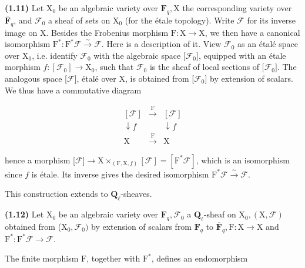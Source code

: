 \documentclass[10pt,leqno]{article}
\begin{document}
\noindent \textbf{(1.11)} Let \(\mathrm{X}_{0}\) be an algebraic variety over \(\mathbf{F}_{q}, \mathrm{X}\) the corresponding variety over \(\overline{\mathbf{F}}_{q}\), and \(\mathcal{F} _{0}\) a sheaf of sets on \(\mathrm{X}_{0}\) (for the étale topology). Write \(\mathcal{F} \) for its inverse image on \(\mathrm{X}\). Besides the Frobenius morphism \(\mathrm{F} : \mathrm{X}\longrightarrow \mathrm{X}\), we then have a canonical isomorphism \(\mathrm{F}^{*} : \mathrm{F}^{*}\mathcal{F}  \xrightarrow{\sim } \mathcal{F} \). Here is a description of it. View \(\mathcal{F} _{0}\) as an étalé space over \(\mathrm{X}_{0}\), i.e. identify \(\mathcal{F} _{0}\) with the algebraic space [\(\mathcal{F} _{0}]\), equipped with an étale morphism \(f : [\mathcal{F} _{0}]\longrightarrow \mathrm{X}_{0}\), such that \(\mathcal{F} _{0}\) is the sheaf of local sections of [\(\mathcal{F} _{0}]\). The analogous space [\(\mathcal{F} ]\), étalé over \(\mathrm{X}\), is obtained from [\(\mathcal{F} _{0}]\) by extension of scalars. We thus have a commutative diagram\par

\[\begin{array}{ccc}[\mathcal F]&\xrightarrow{\mathrm F}&[\mathcal F]\\ \downarrow\!f&&\downarrow\!f\\ \mathrm X&\xrightarrow{\mathrm F}&\mathrm X\end{array}\]

\noindent hence a morphism [\(\mathcal{F} ]\longrightarrow \mathrm{X}\times _{(\mathrm{F},\mathrm{X},f)}[\mathcal{F} ]=[\mathrm{F}^{*}\mathcal{F} ]\), which is an isomorphism since \(f\) is étale. Its inverse gives the desired isomorphism \(\mathrm{F}^{*}\mathcal{F}  \xrightarrow{\sim } \mathcal{F} \).\par

\noindent This construction extends to \(\mathbf{Q}_{\ell }\)-sheaves.\par

\noindent \textbf{(1.12)} Let \(\mathrm{X}_{0}\) be an algebraic variety over \(\mathbf{F}_{q}, \mathcal{F} _{0}\) a \(\mathbf{Q}_{\ell }\)-sheaf on \(\mathrm{X}_{0}, (\mathrm{X},\mathcal{F} )\) obtained from (\(\mathrm{X}_{0},\mathcal{F} _{0})\) by extension of scalars from \(\mathbf{F}_{q}\) to \(\overline{\mathbf{F}}_{q}, \mathrm{F} : \mathrm{X}\longrightarrow \mathrm{X}\) and \(\mathrm{F}^{*} : \mathrm{F}^{*}\mathcal{F} \longrightarrow \mathcal{F} \).\par

\noindent The finite morphism \(\mathrm{F}\), together with \(\mathrm{F}^{*}\), defines an endomorphism\par
\end{document}
